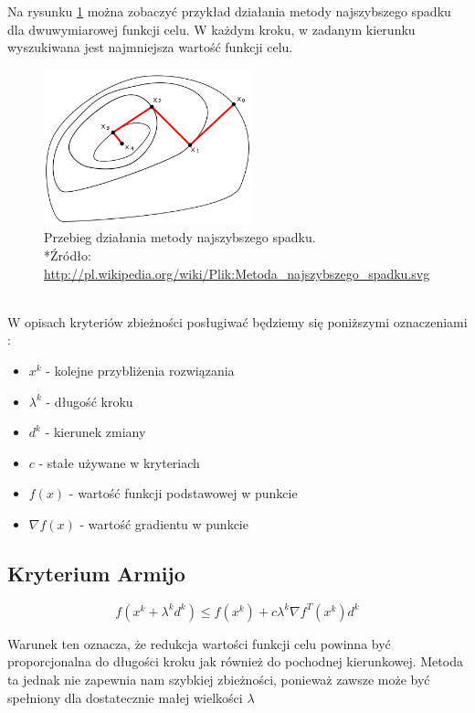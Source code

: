 \documentclass{classrep}
\begin{document}
Na rysunku \ref{fig:metodaNS_przebieg} można zobaczyć przykład działania metody najszybszego spadku dla dwuwymiarowej funkcji celu. W każdym kroku, w zadanym kierunku wyszukiwana jest najmniejsza wartość funkcji celu.
\begin{figure}[h!]
\centering
\includegraphics[width=6cm]{obrazy/metodaNS_przebieg} 
\caption{Przebieg działania metody najszybszego spadku. \\*{\footnotesize Źródło: \url{http://pl.wikipedia.org/wiki/Plik:Metoda_najszybszego_spadku.svg}}}
\label{fig:metodaNS_przebieg}
\end{figure}
\\
W opisach kryteriów zbieżności posługiwać będziemy się poniższymi oznaczeniami :
\begin{itemize}
 \item $x^k$ - kolejne przybliżenia rozwiązania
 \item $\lambda ^k$ - długość kroku
 \item $d ^k$ - kierunek zmiany
 \item $c$ - stałe używane w kryteriach
 \item $f(x)$ - wartość funkcji podstawowej w punkcie
 \item $\nabla f(x)$ - wartość gradientu w punkcie
\end{itemize}
\subsection{Kryterium Armijo}

\begin{equation}
f( x^{k} + \lambda ^{k} d^{k} ) \leq f(x^{k}) + c \lambda ^{k} \nabla f^{T} (x ^{k} ) d^{k}
\end{equation}

Warunek ten oznacza, że redukcja wartości funkcji celu powinna być proporcjonalna do długości kroku jak również do pochodnej kierunkowej. Metoda ta jednak nie zapewnia nam szybkiej zbieżności, ponieważ zawsze może być spełniony dla dostatecznie małej wielkości $\lambda$ 
\end{document}
